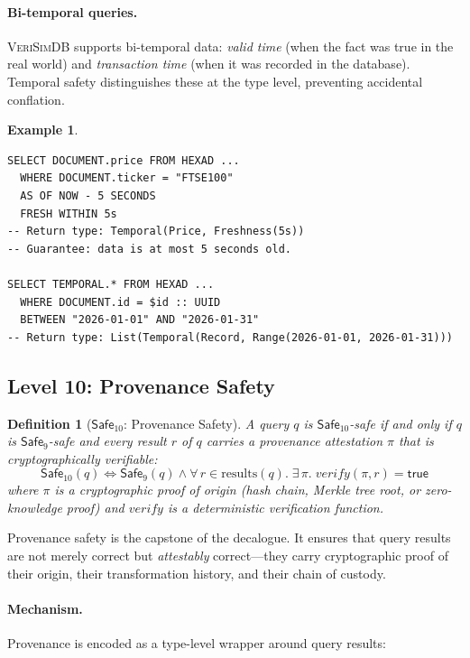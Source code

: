 \documentclass[11pt,a4paper]{article}
\newtheorem{definition}[theorem]{Definition}
\newtheorem{example}[theorem]{Example}
\newcommand{\VeriSimDB}{\textsc{VeriSimDB}}
\newcommand{\Safe}[1]{\ensuremath{\mathsf{Safe}_{#1}}}
\begin{document}
\paragraph{Bi-temporal queries.}
\VeriSimDB{} supports bi-temporal data: \emph{valid time} (when the
fact was true in the real world) and \emph{transaction time} (when it
was recorded in the database).  Temporal safety distinguishes these
at the type level, preventing accidental conflation.

\begin{example}
\begin{lstlisting}[language=VQL]
SELECT DOCUMENT.price FROM HEXAD ...
  WHERE DOCUMENT.ticker = "FTSE100"
  AS OF NOW - 5 SECONDS
  FRESH WITHIN 5s
-- Return type: Temporal(Price, Freshness(5s))
-- Guarantee: data is at most 5 seconds old.

SELECT TEMPORAL.* FROM HEXAD ...
  WHERE DOCUMENT.id = $id :: UUID
  BETWEEN "2026-01-01" AND "2026-01-31"
-- Return type: List(Temporal(Record, Range(2026-01-01, 2026-01-31)))
\end{lstlisting}
\end{example}

\subsection{Level 10: Provenance Safety}\label{sec:L10}

\begin{definition}[\Safe{10}: Provenance Safety]
A query $q$ is \Safe{10}-safe if and only if $q$ is \Safe{9}-safe and
every result $r$ of $q$ carries a provenance attestation $\pi$ that
is cryptographically verifiable:
\[
  \Safe{10}(q) \iff \Safe{9}(q) \land
  \forall\, r \in \mathrm{results}(q).\;
  \exists\, \pi.\; \mathit{verify}(\pi, r) = \mathsf{true}
\]
where $\pi$ is a cryptographic proof of origin (hash chain, Merkle
tree root, or zero-knowledge proof) and $\mathit{verify}$ is a
deterministic verification function.
\end{definition}

Provenance safety is the capstone of the decalogue.  It ensures that
query results are not merely correct but \emph{attestably}
correct---they carry cryptographic proof of their origin, their
transformation history, and their chain of custody.

\paragraph{Mechanism.}
Provenance is encoded as a type-level wrapper around query results:
\end{document}
